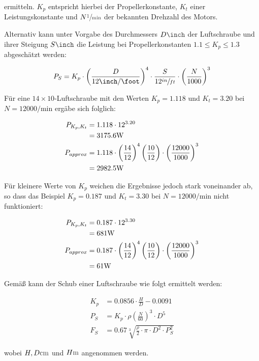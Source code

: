ermitteln. $K_p$ entspricht hierbei der Propellerkonstante, $K_t$ einer Leistungskonstante  und $N \withunit{\per\minute}$ der bekannten Drehzahl des Motors.

\bigbreak

Alternativ kann unter Vorgabe des Durchmessers $D \withunit{\inch}$ der Luftschraube und ihrer Steigung $S \withunit{\inch}$ die Leistung bei Propellerkonstanten $1.1 \leq K_p \leq 1.3$ abgeschätzt werden:

\begin{align}
	P_S = K_p \cdot \left(\frac{D}{12 \si{\inch\per\foot}}\right)^4 \cdot \frac{S}{12 \sfrac{in}{ft}} \cdot \left(\frac{N}{1000}\right)^3
\end{align}

Für eine $14\times 10$-Luftschraube mit den Werten $K_p = 1.118$ und $K_t = 3.20$ bei $N = 12000 \si{\per\minute}$  ergäbe sich folglich:

\begin{align}
	P_{K_p,K_t} &= 1.118 \cdot 12^{3.20} \\ &= 3175.6 \si{\watt} \notag\\
	P_{approx} &= 1.118 \cdot \left(\frac{14}{12}\right)^4 \left(\frac{10}{12}\right) \cdot \left(\frac{12000}{1000}\right)^3 \\ &= 2982.5 \si{\watt} \notag
\end{align}

Für kleinere Werte von $K_p$ weichen die Ergebnisse jedoch stark voneinander ab, so dass das Beispiel $K_p = 0.187$ und $K_t = 3.30$ bei $N = 12000 \si{\per\minute}$  nicht funktioniert:

\begin{align}
	P_{K_p,K_t} &= 0.187 \cdot 12^{3.30} \\ &= 681 \si{\watt} \notag\\
	P_{approx} &= 0.187 \cdot \left(\frac{14}{12}\right)^4 \left(\frac{10}{12}\right) \cdot \left(\frac{12000}{1000}\right)^3 \\ &= 61 \si{\watt} \notag
\end{align}

\bigbreak

Gemäß \cite{standschub} kann der Schub einer Luftschraube wie folgt ermittelt werden:

\begin{align}
	K_p &= 0.0856 \cdot \frac{H}{D} - 0.0091 \\
	P_S &= K_p \cdot \rho \left(\frac{N}{60}\right)^3 \cdot D^5 \\
	F_S &= 0.67 \sqrt[3]{\frac{\rho}{2}\cdot\pi \cdot D^2 \cdot P_S^2}
\end{align}

wobei $H,D \withunit{\centi\meter}$ und $H \withunit{\meter}$ angenommen werden.

